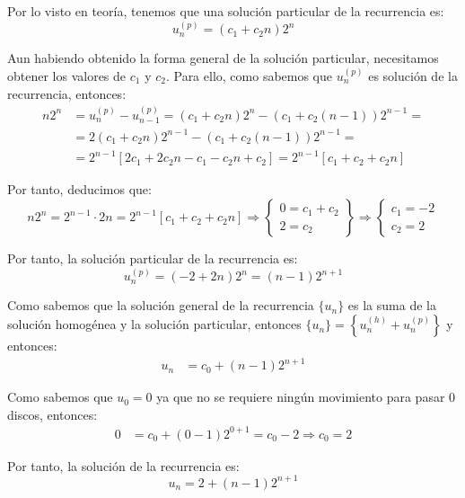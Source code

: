 \begin{ejercicio}
\begin{enumerate}
        Por lo visto en teoría, tenemos que una solución particular de la recurrencia es:
        \begin{equation*}
            u_n^{(p)} = (c_1 + c_2n)2^n
        \end{equation*}

        Aun habiendo obtenido la forma general de la solución particular, necesitamos obtener los valores de $c_1$ y $c_2$.
        Para ello, como sabemos que $u_n^{(p)}$ es solución de la recurrencia, entonces:
        \begin{align*}
            n2^n &= u_{n}^{(p)} - u_{n-1}^{(p)} = (c_1 + c_2n)2^{n} - (c_1 + c_2(n-1))2^{n-1} =\\
            &= 2(c_1+c_2n)2^{n-1} - (c_1+c_2(n-1))2^{n-1} =\\
            &= 2^{n-1}[2c_1 + 2c_2n - c_1 - c_2n + c_2]
            = 2^{n-1}[c_1 + c_2 +c_2n]
        \end{align*}

        Por tanto, deducimos que:
        \begin{equation*}
            n2^n = 2^{n-1}\cdot 2n =
            2^{n-1}[c_1 + c_2 +c_2n] \Longrightarrow
            \left\{
                \begin{array}{l}
                    0 = c_1 + c_2 \\
                    2 = c_2
                \end{array}
            \right\} \Longrightarrow
            \left\{
                \begin{array}{l}
                    c_1 = -2 \\
                    c_2 = 2
                \end{array}
            \right.
        \end{equation*}

        Por tanto, la solución particular de la recurrencia es:
        \begin{equation*}
            u_n^{(p)} = (-2 + 2n)2^n = (n-1)2^{n+1}
        \end{equation*}

        Como sabemos que la solución general de la recurrencia $\{u_n\}$ es la suma de la solución homogénea y la solución particular, entonces
        $\{u_n\} = \left\{u_n^{(h)} + u_n^{(p)}\right\}$ y entonces:
        \begin{align*}
            u_n &= c_0 + (n-1)2^{n+1}
        \end{align*}

        Como sabemos que $u_0 = 0$ ya que no se requiere ningún movimiento para pasar 0 discos, entonces:
        \begin{align*}
            0 &= c_0 + (0-1)2^{0+1} = c_0 - 2 \Longrightarrow c_0 = 2
        \end{align*}

        Por tanto, la solución de la recurrencia es:
        \begin{equation*}
            u_n = 2 + (n-1)2^{n+1}
        \end{equation*}
    \end{enumerate}
\end{ejercicio}

